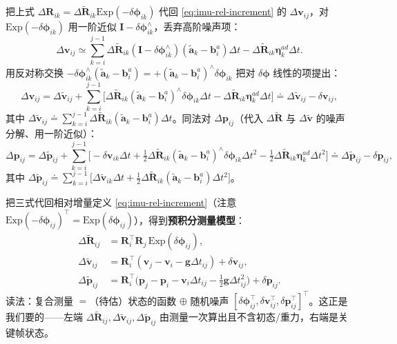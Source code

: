 \begin{derivation}[速度与位置增量的噪声分离]
把上式 $\Delta\mathbf R_{ik}=\Delta\tilde{\mathbf R}_{ik}\mathrm{Exp}(-\delta\boldsymbol\phi_{ik})$ 代回 \cref{eq:imu-rel-increment} 的 $\Delta\mathbf v_{ij}$，对 $\mathrm{Exp}(-\delta\boldsymbol\phi_{ik})$ 用一阶近似 $\mathbf I-\delta\boldsymbol\phi_{ik}^\wedge$，丢弃高阶噪声项：
\[
  \Delta\mathbf v_{ij}\simeq\sum_{k=i}^{j-1}\Delta\tilde{\mathbf R}_{ik}(\mathbf I-\delta\boldsymbol\phi_{ik}^\wedge)(\tilde{\mathbf a}_k-\mathbf b_i^a)\Delta t-\Delta\tilde{\mathbf R}_{ik}\boldsymbol\eta_k^{ad}\Delta t.
\]
用反对称交换 $-\delta\boldsymbol\phi_{ik}^\wedge(\tilde{\mathbf a}_k-\mathbf b_i^a)=+(\tilde{\mathbf a}_k-\mathbf b_i^a)^\wedge\delta\boldsymbol\phi_{ik}$ 把对 $\delta\boldsymbol\phi$ 线性的项提出：
\[
  \Delta\mathbf v_{ij}=\Delta\tilde{\mathbf v}_{ij}+\sum_{k=i}^{j-1}\Big[\Delta\tilde{\mathbf R}_{ik}(\tilde{\mathbf a}_k-\mathbf b_i^a)^\wedge\delta\boldsymbol\phi_{ik}\Delta t-\Delta\tilde{\mathbf R}_{ik}\boldsymbol\eta_k^{ad}\Delta t\Big]\doteq\Delta\tilde{\mathbf v}_{ij}-\delta\mathbf v_{ij},
\]
其中 $\Delta\tilde{\mathbf v}_{ij}\doteq\sum_{k=i}^{j-1}\Delta\tilde{\mathbf R}_{ik}(\tilde{\mathbf a}_k-\mathbf b_i^a)\Delta t$。同法对 $\Delta\mathbf p_{ij}$（代入 $\Delta\tilde{\mathbf R}$ 与 $\Delta\tilde{\mathbf v}$ 的噪声分解、用一阶近似）：
\[
  \Delta\mathbf p_{ij}=\Delta\tilde{\mathbf p}_{ij}+\sum_{k=i}^{j-1}\Big[-\delta\mathbf v_{ik}\Delta t+\tfrac12\Delta\tilde{\mathbf R}_{ik}(\tilde{\mathbf a}_k-\mathbf b_i^a)^\wedge\delta\boldsymbol\phi_{ik}\Delta t^2-\tfrac12\Delta\tilde{\mathbf R}_{ik}\boldsymbol\eta_k^{ad}\Delta t^2\Big]\doteq\Delta\tilde{\mathbf p}_{ij}-\delta\mathbf p_{ij},
\]
其中 $\Delta\tilde{\mathbf p}_{ij}\doteq\sum_{k=i}^{j-1}\big[\Delta\tilde{\mathbf v}_{ik}\Delta t+\tfrac12\Delta\tilde{\mathbf R}_{ik}(\tilde{\mathbf a}_k-\mathbf b_i^a)\Delta t^2\big]$。
\end{derivation}

把三式代回相对增量定义 \cref{eq:imu-rel-increment}（注意 $\mathrm{Exp}(-\delta\boldsymbol\phi_{ij})^\top=\mathrm{Exp}(\delta\boldsymbol\phi_{ij})$），得到\textbf{预积分测量模型}：
\begin{equation}
\boxed{\;
\begin{aligned}
  \Delta\tilde{\mathbf R}_{ij}&=\mathbf R_i^\top\mathbf R_j\,\mathrm{Exp}(\delta\boldsymbol\phi_{ij}),\\
  \Delta\tilde{\mathbf v}_{ij}&=\mathbf R_i^\top(\mathbf v_j-\mathbf v_i-\mathbf g\Delta t_{ij})+\delta\mathbf v_{ij},\\
  \Delta\tilde{\mathbf p}_{ij}&=\mathbf R_i^\top\Big(\mathbf p_j-\mathbf p_i-\mathbf v_i\Delta t_{ij}-\tfrac12\mathbf g\Delta t_{ij}^2\Big)+\delta\mathbf p_{ij}.
\end{aligned}
\;}
  \label{eq:imu-preint-model}
\end{equation}
读法：复合测量 $=$（待估）状态的函数 $\oplus$ 随机噪声 $[\delta\boldsymbol\phi_{ij}^\top,\delta\mathbf v_{ij}^\top,\delta\mathbf p_{ij}^\top]^\top$。这正是我们要的——左端 $\Delta\tilde{\mathbf R}_{ij},\Delta\tilde{\mathbf v}_{ij},\Delta\tilde{\mathbf p}_{ij}$ 由测量一次算出且不含初态/重力，右端是关键帧状态。

